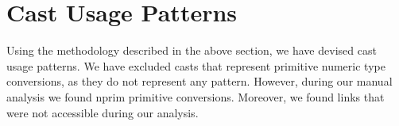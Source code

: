 

\newcommand{\castpatternsection}[1]{\noindent\textbf{#1.}}
\newcommand{\pname}[1]{\textsc{#1}}
\newcommand{\group}[1]{

\

\

{\noindent\Large Patterns for \textsc{#1}}

\


}


\newenvironment{pattern}[1]{
\newcommand{\nocc}{\csname n#1Pattern\endcsname{}}
\newcommand{\noccsrc}{\csname n#1PatternSrc\endcsname{}}
\newcommand{\noccgen}{\csname n#1PatternGen\endcsname{}}
\newcommand{\nocctest}{\csname n#1PatternTest\endcsname{}}
\newcommand{\pocc}{\csname p#1Pattern\endcsname{}}

\newcommand{\desc}{\castpatternsection{Description}}
\newcommand{\instances}{\castpatternsection{Instances: \nocc{} (\pocc\%)}
We found \noccsrc{} in application code, \nocctest{} in test code, and \noccgen{} in generated code.}
\newcommand{\discussion}{\castpatternsection{Discussion}}
\newcommand{\detection}{\castpatternsection{Detection}}
\newcommand{\related}{\castpatternsection{Related}}
\newcommand{\thisp}{\textsc{#1}}
\subsection{\pname{#1}}
\label{pat:#1}
\desc
}{}


\section{Cast Usage Patterns}
\label{sec:casts:patterns}

%
Using the methodology described in the above section,
we have devised \nPattern{} cast usage patterns.
We have excluded casts that represent primitive numeric type conversions,
as they do not represent any pattern.
However, during our manual analysis we found nprim{} primitive conversions.
Moreover, we found \nBrokenLink{} links that were not accessible during our analysis.

